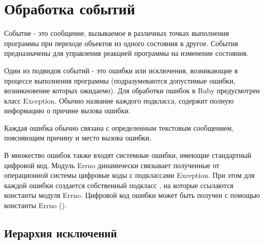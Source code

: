 \chapter{Обработка событий}

Событие - это сообщение, вызываемое в различных точках выполнения программы при переходе объектов из одного состояния в другое. События предназначены для управления реакцией программы на изменение состояния.
  
Один из подвидов событий - это ошибки или исключения, возникающие в процессе выполнения программы (подразумеваются допустимые ошибки, возникновение которых ожидаемо). Для обработки ошибок в Ruby предусмотрен класс Exception. Обычно название каждого подкласса, содержит полную информацию о причине вызова ошибки.

Каждая ошибка обычно связана с определенным текстовым сообщением, поясняющим причину и место вызова ошибки.

В множество ошибок также входят системные ошибки, имеющие стандартный цифровой код. Модуль Errno динамически связывает полученные от операционной системы цифровые коды с подклассами Exception. При этом для каждой ошибки создается собственный подкласс , на которые ссылаются константы модуля Errno. Цифровой код ошибки может быть получен с помощью константы Errno (). 

\section{Иерархия исключений}

